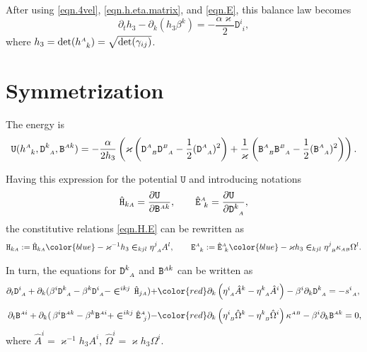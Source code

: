 \documentclass[
10pt, %
a4paper, %
oneside, %
headinclude,footinclude, %
BCOR5mm, %
]{scrartcl}
\newcommand{\sA}{\mathsmaller A}
\newcommand{\sB}{\mathsmaller B}
\newcommand{\pd}[1]{\partial_{#1}}
\newcommand{\mg}[1]{\kappa_{#1}}			%
\newcommand{\MG}[1]{\kappa^{#1}}			%
\newcommand{\tetrsymbol}{h}
\newcommand{\itetrsymbol}{\eta}
\newcommand{\itetr}[2]{\itetrsymbol^{#1}_{\phantom{#1}#2}}
\newcommand{\tetr}[2]{\tetrsymbol^{#1}_{\phantom{#1}#2}}
\newcommand{\stress}[2]{s_{\ #1}^{#2}}
\newcommand{\detTetr}{\tetrsymbol}
\newcommand{\Dfin}[2]{\mathtt{D}_{\phantom{#2}#1}^{#2}}	%
\newcommand{\Hfin}[2]{\mathtt{H}_{#2#1}}	%
\newcommand{\Efin}[2]{\mathtt{E}^{#1}_{\phantom{#1}#2}}	%
\newcommand{\Ufin}{\mathtt{U}}
\newcommand{\Hfinn}[2]{\hat{\mathtt{H}}_{{#2}{#1}}}	%
\newcommand{\Efinn}[2]{\hat{\mathtt{E}}^{#1}_{\ #2}}	%
\newcommand{\Bfin}[2]{\mathtt{B}^{#1#2}}	%
\newcommand{\Bfinmix}[2]{\mathtt{B}^{#1}_{\phantom{#1}#2}}	%
\newcommand{\LCsymb}{\bm{\in}}    %
\newcommand{\shift}[1]{\beta^{#1}}
\begin{document}
   
After using \eqref{eqn.4vel}, \eqref{eqn.h.eta.matrix}, and \eqref{eqn.E}, this balance law becomes
\begin{equation}\label{eqn.h.PDE}
	\pd{t}\detTetr_3 - \pd{k}(\detTetr_3\shift{k} ) =-\frac{\alpha \varkappa}{2} \Dfin{i}{i},
\end{equation}
where $ \detTetr_3 =\det(\tetr{\sA}{k}) = \sqrt{\det(\gamma_{ij})} $.



\section{Symmetrization}

The energy is
\begin{equation}
	\Ufin(\tetr{\sA}{k},\Dfin{\sA}{k},\Bfin{\sA}{k}) = 
	-\frac{\alpha}{2\detTetr_3} \left( 
	\varkappa \left( \Dfin{\sB}{\sA} \Dfin{\sA}{\sB} - \frac{1}{2} (\Dfin{\sA}{\sA})^2\right)
	+
	\frac{1}{\varkappa} \left( \Bfinmix{\sA}{\sB} \Bfinmix{\sB}{\sA} - \frac{1}{2} 
	(\Bfinmix{\sA}{\sA})^2
	\right)
	\right).
\end{equation}

Having this expression for the potential $ \Ufin $ and introducing notations
\begin{equation}
	\Hfinn{\sA}{k} = \frac{\partial \Ufin\hfill}{\partial \Bfin{\sA}{k}},
	\qquad
	\Efinn{\sA}{k} = \frac{\partial \Ufin\hfill}{\partial \Dfin{\sA}{k}},	
\end{equation}
the constitutive relations \eqref{eqn.H.E} can be rewritten as
\begin{equation}\label{eqn.H.E.split}
	\Hfin{\sA}{k} := %
	\Hfinn{\sA}{k}
	{ 
	\color{blue}
	-
	\varkappa^{-1}\detTetr_3 \LCsymb_{kjl} \itetr{j}{\sA} A^l},
	\qquad
	\Efin{\sA}{k} := %
	\Efinn{\sA}{k}
	{
	\color{blue}
	-
	\varkappa \detTetr_3 \LCsymb_{kjl} 
	\itetr{j}{\sB} \mg{\sA\sB} \Omega^l}.
\end{equation}

In turn, the equations for $ \Dfin{\sA}{k} $ and $ \Bfin{\sA}{k} $ can be written as 
\begin{subequations}\label{eqn.BD.hat}
	\begin{align}
		\pd{t} \Dfin{\sA}{i} + \pd{k}(\shift{i} 
		\Dfin{\sA}{k} - \shift{k}\Dfin{\sA}{i}  - \LCsymb^{ikj} \,
		\Hfinn{\sA}{j}) 
		&
		{ + \color{red} \pd{k} 
			\left(
			\itetr{i}{\sA} \hat{A}^k - \itetr{k}{\sA} \hat{A}^i
			\right) }
		-\shift{i}\pd{k} \Dfin{\sA}{k}
		= - \stress{\sA}{i},
		\\[2mm]
		\pd{t} \Bfin{\sA}{i} + \pd{k}(\,\shift{i} 
		\Bfin{\sA}{k} - \shift{k}\Bfin{\sA}{i}  + \LCsymb^{ikj} 
		\Efinn{\sA}{j}) 
		&
		{ - \color{red}\pd{k} 
			\left(
			\itetr{i}{\sB} \hat{\Omega}^k - \itetr{k}{\sB} \hat{\Omega}^i
			\right) \MG{\sA\sB}}
		-\shift{i}\pd{k} \Bfin{\sA}{k}
		= 0,
	\end{align}
\end{subequations}
where {\color{blue}$ \hat{A}^i = \varkappa^{-1} \detTetr_3 A^i $, $ \hat{\Omega}^i = \varkappa 
\detTetr_3 
\Omega^i $.} 
\end{document}
